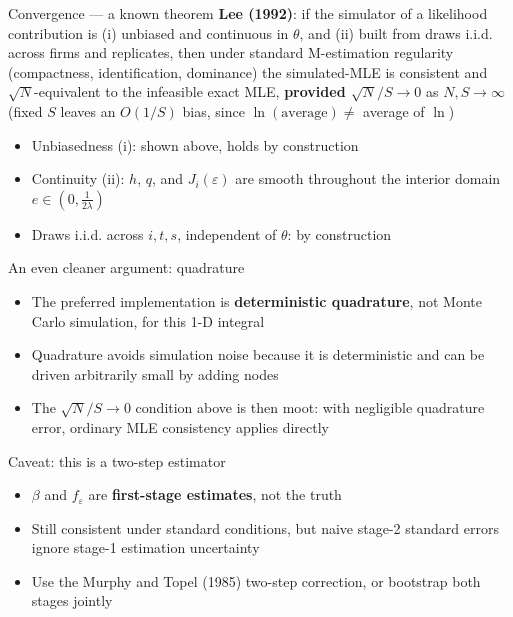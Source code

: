 \documentclass[
  ignorenonframetext,
  aspectratio=169,
]{beamer}
\providecommand{\tightlist}{%
  \setlength{\itemsep}{0pt}\setlength{\parskip}{0pt}}
\begin{document}
\begin{frame}{Convergence --- a known theorem}
\protect{}\label{convergence-a-known-theorem}
\textbf{Lee (1992)}: if the simulator of a likelihood contribution is
(i) unbiased and continuous in \(\theta\), and (ii) built from draws
i.i.d. across firms and replicates, then under standard M-estimation
regularity (compactness, identification, dominance) the simulated-MLE is
consistent and \(\sqrt N\)-equivalent to the infeasible exact MLE,
\textbf{provided \(\sqrt N/S\to0\)} as \(N,S\to\infty\) (fixed \(S\)
leaves an \(O(1/S)\) bias, since \(\ln(\text{average})\ne\) average of
\(\ln\))

\begin{itemize}
\tightlist
\item
  Unbiasedness (i): shown above, holds by construction
\item
  Continuity (ii): \(h\), \(q\), and \(J_i(\varepsilon)\) are smooth
  throughout the interior domain \(e\in(0,\tfrac1{2\lambda})\)
\item
  Draws i.i.d. across \(i,t,s\), independent of \(\theta\): by
  construction
\end{itemize}
\end{frame}

\begin{frame}{An even cleaner argument: quadrature}
\protect{}\label{an-even-cleaner-argument-quadrature}
\begin{itemize}
\tightlist
\item
  The preferred implementation is \textbf{deterministic quadrature}, not
  Monte Carlo simulation, for this 1-D integral
\item
  Quadrature avoids simulation noise because it is deterministic and can
  be driven arbitrarily small by adding nodes
\item
  The \(\sqrt N/S\to0\) condition above is then moot: with negligible
  quadrature error, ordinary MLE consistency applies directly
\end{itemize}
\end{frame}

\begin{frame}{Caveat: this is a two-step estimator}
\protect{}\label{caveat-this-is-a-two-step-estimator}
\begin{itemize}
\tightlist
\item
  \(\beta\) and \(f_\varepsilon\) are \textbf{first-stage estimates},
  not the truth
\item
  Still consistent under standard conditions, but naive stage-2 standard
  errors ignore stage-1 estimation uncertainty
\item
  Use the Murphy and Topel (1985) two-step correction, or bootstrap both
  stages jointly
\end{itemize}
\end{frame}
\end{document}
